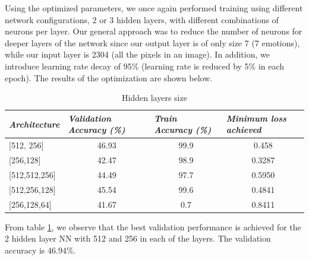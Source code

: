 \documentclass[12pt,twoside]{article}
\begin{document}
Using the optimized parameters, we once again performed training using different network configurations, 2 or 3 hidden layers,  with different combinations of neurons per layer. Our general approach was to reduce the number of neurons for deeper layers of the network since our output layer is of only size 7 (7 emotions), while our input layer is 2304 (all the pixels in an image). In addition, we introduce learning rate decay of 95\% (learning rate is reduced by 5\% in each epoch). The results of the optimization are shown below.

\begin{table}[!htbp]
\centering
\begin{tabular}{|l|c|c|c|}
\hline
\textit{\textbf{Architecture}} & \multicolumn{1}{l|}{\textit{\textbf{Validation Accuracy (\%)}}} & \multicolumn{1}{l|}{\textit{\textbf{Train Accuracy (\%)}}} & \multicolumn{1}{l|}{\textit{\textbf{Minimum loss achieved}}} \\ \hline
{[}512, 256{]}                 & 46.93                                                           & 99.9                                                       & 0.458                                                        \\ \hline
{[}256,128{]}                  & 42.47                                                           & 98.9                                                       & 0.3287                                                       \\ \hline
{[}512,512,256{]}              & 44.49                                                           & 97.7                                                       & 0.5950                                                       \\ \hline
{[}512,256,128{]}              & 45.54                                                           & 99.6                                                       & 0.4841                                                       \\ \hline
{[}256,128,64{]}               & 41.67                                                           & 0.7                                                        & 0.8411                                                       \\ \hline
\end{tabular}
\caption{Hidden layers size}
\label{layers}
\end{table}

From table \ref{layers}, we observe that the best validation performance is achieved for the 2 hidden layer NN with 512 and 256 in each of the layers. The validation accuracy is 46.94\%. 
\end{document}
